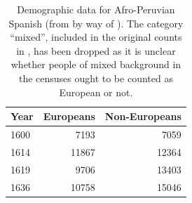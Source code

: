 \begin{table}
\caption{Demographic data for Afro-Peruvian Spanish (from \cite{Bow1974} by way of \cite{Kauhanen2022}). The category ``mixed'', included in the original counts in \textcite{Bow1974}, has been dropped as it is unclear whether people of mixed background in the censuses ought to be counted as European or not.}\label{tbl:data-aps}
\begin{tabular}{lrr}
\toprule
Year & Europeans & Non-Europeans\\
\midrule
1600 & 7193 & 7059\\
1614 & 11867 & 12364\\
1619 & 9706 & 13403\\
1636 & 10758 & 15046\\
\bottomrule
\end{tabular}
\end{table}
